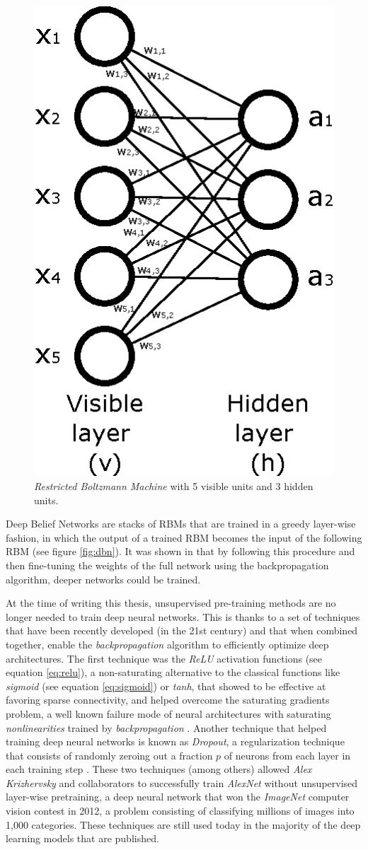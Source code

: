 \begin{figure}
	\centering
	\includegraphics[width=0.4\linewidth]{chapter2/images/rbm}
	\caption{\textit{Restricted Boltzmann Machine} with 5 visible units and 3 hidden units.}
	\label{fig:rbm}
\end{figure}

Deep Belief Networks are stacks of RBMs that are trained in a greedy layer-wise fashion, in which the output of a trained RBM becomes the input of the following RBM \autocite{hinton2006} (see figure \ref{fig:dbn}). It was shown in \autocite{Bengio2007} that by following this procedure and then fine-tuning the weights of the full network using the backpropagation algorithm, deeper networks could be trained.


At the time of writing this thesis, unsupervised pre-training methods are no longer needed to train deep neural networks. This is thanks to a set of techniques that have been recently developed (in the 21st century) and that when combined together, enable the \textit{backpropagation} algorithm to efficiently optimize deep architectures. The first technique was the \textit{ReLU} activation functions \autocite{nair2010} (see equation \ref{eq:relu}), a non-saturating alternative to the classical functions like \textit{sigmoid} (see equation \ref{eq:sigmoid}) or \textit{tanh}, that showed to be effective at favoring sparse connectivity, and helped overcome the saturating gradients problem, a well known failure mode of neural architectures with saturating \textit{nonlinearities} trained by \textit{backpropagation} \autocite{Hong2019}. Another technique that helped training deep neural networks is known as \textit{Dropout}, a regularization technique that consists of randomly zeroing out a fraction $p$ of neurons from each layer in each training step \autocite{hinton2012, srivastava2014}. These two techniques (among others) allowed \textit{Alex Krizhervsky} and collaborators to successfully train \textit{AlexNet} \autocite{krizhevsky2012} without unsupervised layer-wise pretraining, a deep neural network that won the \textit{ImageNet} \autocite{deng2009imagenet} computer vision contest in 2012, a problem consisting of classifying millions of images into 1,000 categories. These techniques are still used today in the majority of the deep learning models that are published.

